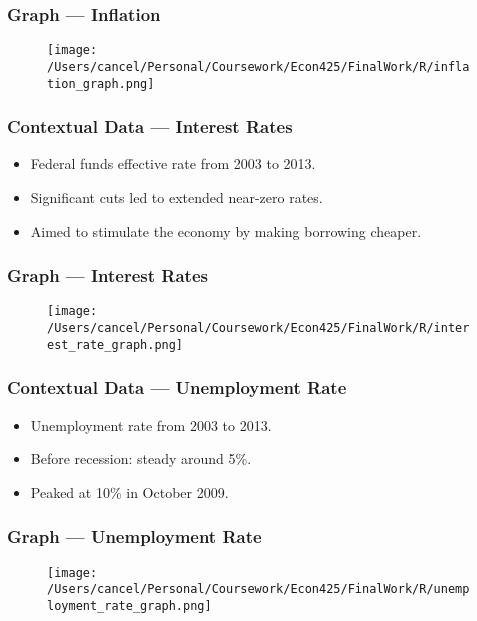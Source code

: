 \documentclass{beamer}
\begin{document}
\begin{frame}
    \frametitle{Graph --- Inflation}
    \begin{figure}[h!]
        \centering
        \texttt{[image: /Users/cancel/Personal/Coursework/Econ425/FinalWork/R/inflation\_graph.png]}
    \end{figure}
\end{frame}


\begin{frame}
    \frametitle{Contextual Data --- Interest Rates}
    \begin{itemize}
        \item Federal funds effective rate from 2003 to 2013.
        \item Significant cuts led to extended near-zero rates.
        \item Aimed to stimulate the economy by making borrowing cheaper.
    \end{itemize}
\end{frame}

\begin{frame}
    \frametitle{Graph --- Interest Rates}
    \begin{figure}[h!]
        \centering
        \texttt{[image: /Users/cancel/Personal/Coursework/Econ425/FinalWork/R/interest\_rate\_graph.png]}
    \end{figure}
\end{frame}


\begin{frame}
    \frametitle{Contextual Data --- Unemployment Rate}
    \begin{itemize}
        \item Unemployment rate from 2003 to 2013.
        \item Before recession: steady around 5\%.
        \item Peaked at 10\% in October 2009.
    \end{itemize}
\end{frame}

\begin{frame}
    \frametitle{Graph --- Unemployment Rate}
    \begin{figure}[h!]
        \centering
        \texttt{[image: /Users/cancel/Personal/Coursework/Econ425/FinalWork/R/unemployment\_rate\_graph.png]}
    \end{figure}
\end{frame}
\end{document}
